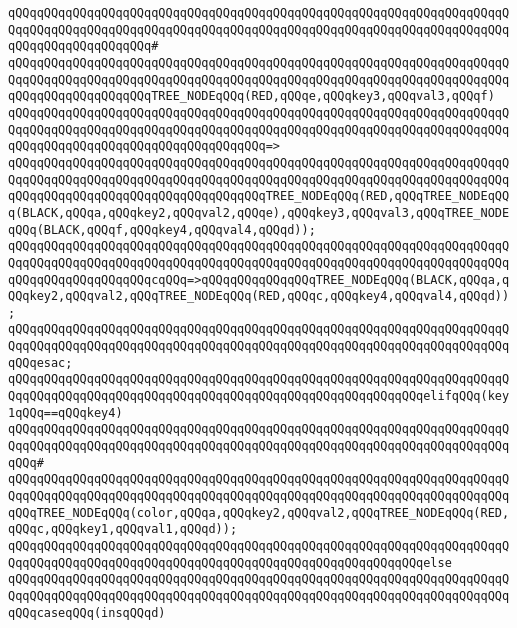 \verb|qQQqqQQqqQQqqQQqqQQqqQQqqQQqqQQqqQQqqQQqqQQqqQQqqQQqqQQqqQQqqQQqqQQqqQQqqQQqqQQqqQQqqQQqqQQqqQQqqQQqqQQqqQQqqQQqqQQqqQQqqQQqqQQqqQQqqQQqqQQqqQQqqQQqqQQqqQQqqQQq#|\newline
\verb|qQQqqQQqqQQqqQQqqQQqqQQqqQQqqQQqqQQqqQQqqQQqqQQqqQQqqQQqqQQqqQQqqQQqqQQqqQQqqQQqqQQqqQQqqQQqqQQqqQQqqQQqqQQqqQQqqQQqqQQqqQQqqQQqqQQqqQQqqQQqqQQqqQQqqQQqqQQqqQQqTREE_NODEqQQq(RED,qQQqe,qQQqkey3,qQQqval3,qQQqf)|\newline
\verb|qQQqqQQqqQQqqQQqqQQqqQQqqQQqqQQqqQQqqQQqqQQqqQQqqQQqqQQqqQQqqQQqqQQqqQQqqQQqqQQqqQQqqQQqqQQqqQQqqQQqqQQqqQQqqQQqqQQqqQQqqQQqqQQqqQQqqQQqqQQqqQQqqQQqqQQqqQQqqQQqqQQqqQQqqQQqqQQq=>|\newline
\verb|qQQqqQQqqQQqqQQqqQQqqQQqqQQqqQQqqQQqqQQqqQQqqQQqqQQqqQQqqQQqqQQqqQQqqQQqqQQqqQQqqQQqqQQqqQQqqQQqqQQqqQQqqQQqqQQqqQQqqQQqqQQqqQQqqQQqqQQqqQQqqQQqqQQqqQQqqQQqqQQqqQQqqQQqqQQqqQQqTREE_NODEqQQq(RED,qQQqTREE_NODEqQQq(BLACK,qQQqa,qQQqkey2,qQQqval2,qQQqe),qQQqkey3,qQQqval3,qQQqTREE_NODEqQQq(BLACK,qQQqf,qQQqkey4,qQQqval4,qQQqd));|\newline
\newline
\verb|qQQqqQQqqQQqqQQqqQQqqQQqqQQqqQQqqQQqqQQqqQQqqQQqqQQqqQQqqQQqqQQqqQQqqQQqqQQqqQQqqQQqqQQqqQQqqQQqqQQqqQQqqQQqqQQqqQQqqQQqqQQqqQQqqQQqqQQqqQQqqQQqqQQqqQQqqQQqqQQqcqQQq=>qQQqqQQqqQQqqQQqTREE_NODEqQQq(BLACK,qQQqa,qQQqkey2,qQQqval2,qQQqTREE_NODEqQQq(RED,qQQqc,qQQqkey4,qQQqval4,qQQqd));|\newline
\verb|qQQqqQQqqQQqqQQqqQQqqQQqqQQqqQQqqQQqqQQqqQQqqQQqqQQqqQQqqQQqqQQqqQQqqQQqqQQqqQQqqQQqqQQqqQQqqQQqqQQqqQQqqQQqqQQqqQQqqQQqqQQqqQQqqQQqqQQqqQQqqQQqesac;|\newline
\verb|qQQqqQQqqQQqqQQqqQQqqQQqqQQqqQQqqQQqqQQqqQQqqQQqqQQqqQQqqQQqqQQqqQQqqQQqqQQqqQQqqQQqqQQqqQQqqQQqqQQqqQQqqQQqqQQqqQQqqQQqqQQqqQQqelifqQQq(key1qQQq==qQQqkey4)|\newline
\verb|qQQqqQQqqQQqqQQqqQQqqQQqqQQqqQQqqQQqqQQqqQQqqQQqqQQqqQQqqQQqqQQqqQQqqQQqqQQqqQQqqQQqqQQqqQQqqQQqqQQqqQQqqQQqqQQqqQQqqQQqqQQqqQQqqQQqqQQqqQQqqQQq#|\newline
\verb|qQQqqQQqqQQqqQQqqQQqqQQqqQQqqQQqqQQqqQQqqQQqqQQqqQQqqQQqqQQqqQQqqQQqqQQqqQQqqQQqqQQqqQQqqQQqqQQqqQQqqQQqqQQqqQQqqQQqqQQqqQQqqQQqqQQqqQQqqQQqqQQqTREE_NODEqQQq(color,qQQqa,qQQqkey2,qQQqval2,qQQqTREE_NODEqQQq(RED,qQQqc,qQQqkey1,qQQqval1,qQQqd));|\newline
\verb|qQQqqQQqqQQqqQQqqQQqqQQqqQQqqQQqqQQqqQQqqQQqqQQqqQQqqQQqqQQqqQQqqQQqqQQqqQQqqQQqqQQqqQQqqQQqqQQqqQQqqQQqqQQqqQQqqQQqqQQqqQQqqQQqelse|\newline
\verb|qQQqqQQqqQQqqQQqqQQqqQQqqQQqqQQqqQQqqQQqqQQqqQQqqQQqqQQqqQQqqQQqqQQqqQQqqQQqqQQqqQQqqQQqqQQqqQQqqQQqqQQqqQQqqQQqqQQqqQQqqQQqqQQqqQQqqQQqqQQqqQQqcaseqQQq(insqQQqd)|\newline
